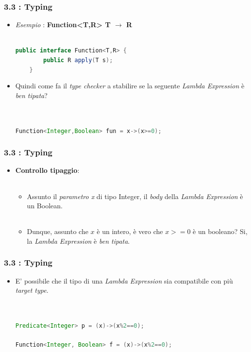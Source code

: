\documentclass{beamer}
\begin{document}

\begin{frame}[fragile]
	\frametitle{\textbf{3.3 : Typing}}
	\begin{itemize}
		\item
			\textit{Esempio} : \textbf{Function<T,R> \quad T $\rightarrow$ R}\\\
\begin{lstlisting}[language=Java]
 	public interface Function<T,R> {
		public R apply(T s);
	}
\end{lstlisting}
		\item 
			Quindi come fa il \textit{type checker} a stabilire se la seguente \textit{Lambda Expression} è \textit{ben tipata}?\\\
\begin{lstlisting}[language=Java]

Function<Integer,Boolean> fun = x->(x>=0);

\end{lstlisting}
	\end{itemize}
\end{frame}


\begin{frame}[fragile]
	\frametitle{\textbf{3.3 : Typing}}
	\begin{itemize}
		\item
			\textbf{Controllo tipaggio}:\\\
			\begin{itemize}
				\item 
					Assunto il \textit{parametro x} di tipo Integer, il \textit{body} della \textit{Lambda Expression} è un Boolean.\\\
				\item 
					Dunque, assunto che $x$ è un intero, è vero che $x>=0$ è un booleano? Si, la \textit{Lambda Expression} è \textit{ben tipata}.
			\end{itemize}
	\end{itemize}
\end{frame}


\begin{frame}[fragile]
	\frametitle{\textbf{3.3 : Typing}}
	\begin{itemize}
		\item
			E' possibile che il tipo di una \textit{Lambda Expression} sia compatibile con più \textit{target type}.\\\
\begin{lstlisting}[language=Java]

Predicate<Integer> p = (x)->(x%2==0);

Function<Integer, Boolean> f = (x)->(x%2==0);

\end{lstlisting}
	\end{itemize}
\end{frame}
\end{document}
